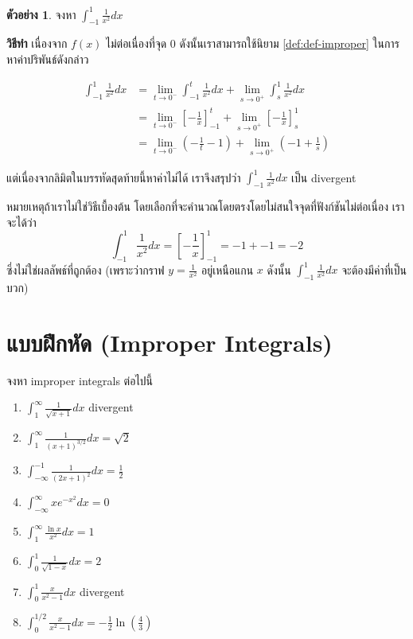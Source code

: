 \documentclass[
]{book}
\theoremstyle{definition}
\theoremstyle{definition}
\newtheorem{example}{ตัวอย่าง}[chapter]
\theoremstyle{definition}
\theoremstyle{definition}
\theoremstyle{remark}
\begin{document}
\begin{example}
จงหา \(\int_{-1}^{1} \frac{1}{x^2} dx\)
\end{example}

\textbf{วิธีทำ} เนื่องจาก \(f(x)\) ไม่ต่อเนื่องที่จุด 0 ดังนั้นเราสามารถใช้นิยาม
\ref{def:def-improper} ในการหาค่าปริพันธ์ดังกล่าว

\begin{equation}
\begin{aligned}
        \int_{-1}^{1} \frac{1}{x^2} dx &= \lim_{t \rightarrow 0^{-} }\int_{-1}^{t} \frac{1}{x^2}dx
                                            + \lim_{s \rightarrow 0^{+}} \int_{s}^{1} \frac{1}{x^2}dx \\
        &= \lim_{t \rightarrow 0^{-}} \left[ -\frac{1}{x}\right]_{-1}^t 
        + \lim_{s \rightarrow 0^{+}} \left[ -\frac{1}{x}\right]_{s}^1 \\
        &= \lim_{t \rightarrow 0^{-}} (-\frac{1}{t} - 1) + \lim_{s \rightarrow 0^{+}} (-1 +\frac{1}{s})
\end{aligned}
\end{equation}

แต่เนื่องจากลิมิตในบรรทัดสุดท้ายนี้หาค่าไม่ได้ เราจึงสรุปว่า
\(\int_{-1}^{1} \frac{1}{x^2} dx\) เป็น divergent

หมายเหตุถ้าเราไม่ใช่วิธีเบื้องต้น โดยเลือกที่จะคำนวณโดยตรงโดยไม่สนใจจุดที่ฟังก์ชันไม่ต่อเนื่อง
เราจะได้ว่า
\[\int_{-1}^{1} \frac{1}{x^2} dx  = \left[ -\frac{1}{x}\right]_{-1}^1 = -1 + -1 = -2\]
ซึ่งไม่ใช่ผลลัพธ์ที่ถูกต้อง (เพราะว่ากราฟ \(y = \frac{1}{x^2}\) อยู่เหนือแกน \(x\) ดังนั้น
\(\int_{-1}^{1} \frac{1}{x^2} dx\) จะต้องมีค่าที่เป็นบวก)

\section{แบบฝึกหัด (Improper Integrals)}\label{uxe41uxe1auxe1auxe1duxe01uxe2buxe14-improper-integrals}

จงหา improper integrals ต่อไปนี้

\begin{enumerate}
\def\labelenumi{\arabic{enumi}.}
\item
  \(\int_{1}^{\infty} \frac{1}{\sqrt{x+1}} dx\) divergent
\item
  \(\int_{1}^{\infty} \frac{1}{(x+1)^{3/2}}dx = \sqrt{2}\)
\item
  \(\int_{-\infty}^{-1} \frac{1}{(2x + 1)^2} dx = \frac{1}{2}\)
\item
  \(\int_{-\infty}^{\infty} x e^{-x^2} dx = 0\)
\item
  \(\int_{1}^{\infty} \frac{\ln x}{x^2}  dx = 1\)
\item
  \(\int_0^1 \frac{1}{\sqrt{1-x}} dx = 2\)
\item
  \(\int_0^{1} \frac{x}{x^2-1} dx\) divergent
\item
  \(\int_0^{1/2} \frac{x}{x^2-1} dx = -\frac{1}{2} \ln (\frac{4}{3})\)
\end{enumerate}
\end{document}
